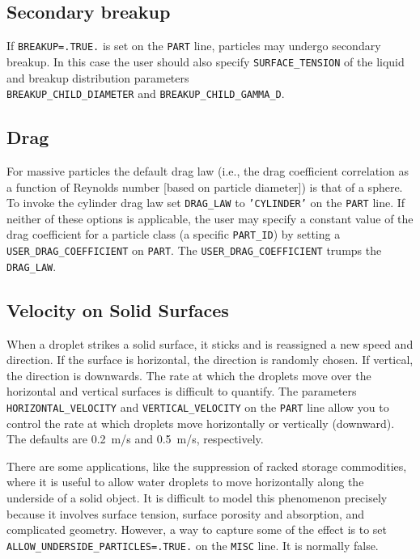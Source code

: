 \documentclass[11pt]{book}
\newcommand{\ct}{\tt\small}
\begin{document}
\subsection{Secondary breakup}
\label{info:secondary_breakup}
If {\ct BREAKUP=.TRUE.} is set on the {\ct PART} line, particles may undergo secondary breakup.
In this case the user should also specify {\ct SURFACE\_TENSION} of the liquid and breakup distribution parameters \\
{\ct BREAKUP\_CHILD\_DIAMETER} and {\ct BREAKUP\_CHILD\_GAMMA\_D}.


\subsection{Drag}
\label{info:particle_drag}

For massive particles the default drag law (i.e., the drag coefficient correlation as a function of Reynolds number [based on particle diameter]) is that of a sphere.
To invoke the cylinder drag law set {\ct DRAG\_LAW} to {\ct 'CYLINDER'} on the {\ct PART} line.  If neither of these options is applicable,
the user may specify a constant value of the drag coefficient for a particle class (a specific {\ct PART\_ID}) by setting a {\ct USER\_DRAG\_COEFFICIENT} on {\ct PART}.
The {\ct USER\_DRAG\_COEFFICIENT} trumps the {\ct DRAG\_LAW}.

\subsection{Velocity on Solid Surfaces}
\label{info:surface_droplets}

When a droplet strikes a solid surface, it sticks and is reassigned a new speed and direction. If the surface is
horizontal, the direction is randomly chosen. If vertical, the direction is downwards.
The rate at which the droplets move over the horizontal and vertical surfaces is difficult to
quantify. The parameters {\ct HORIZONTAL\_VELOCITY} and {\ct VERTICAL\_VELOCITY} on the {\ct PART} line
allow you to control the rate at which droplets move horizontally or vertically (downward). The defaults are
0.2~m/s and 0.5~m/s, respectively.

There are some applications, like the suppression of racked storage commodities, where it is useful to allow water droplets to move horizontally
along the underside of a solid object. It is difficult to model this phenomenon precisely because it involves surface tension, surface porosity and
absorption, and complicated geometry. However, a way to capture some of the effect is to set {\ct ALLOW\_UNDERSIDE\_PARTICLES=.TRUE.} on the
{\ct MISC} line. It is normally false.
\end{document}
